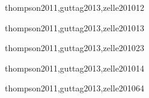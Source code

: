 \begin{syllabus}
\begin{unit}{\PLOverviewDef}{thompson2011,guttag2013,zelle2010}{1}{2}
   \begin{unitgoals}
      \item \PLOverviewObjONE
      \item \PLOverviewObjTWO
   \end{unitgoals}
\end{unit}

\begin{unit}{\PLDeclarationsAndTypesDef}{thompson2011,guttag2013,zelle2010}{1}{3}
    \begin{topics}%
	\item \PLDeclarationsAndTypesTopicThe%
	\item \PLDeclarationsAndTypesTopicOverview%
    \end{topics}%
    \PLDeclarationsAndTypesAllObjectives
\end{unit}

\begin{unit}{\PFFundamentalConstructsDef}{thompson2011,guttag2013,zelle2010}{2}{3}
  \PFFundamentalConstructsAllTopics
  \PFFundamentalConstructsAllObjectives
\end{unit}

\begin{unit}{\PLFunctionalProgrammingDef}{thompson2011,guttag2013,zelle2010}{1}{4}
    \begin{topics}%
	\item \PLFunctionalProgrammingTopicOverview%
	\item \PLFunctionalProgrammingTopicRecursion%
	\item \PLFunctionalProgrammingTopicPragmatics%
    \end{topics}%
   \PLFunctionalProgrammingAllObjectives
\end{unit}

\begin{unit}{\PFRecursionDef}{thompson2011,guttag2013,zelle2010}{6}{4}
    \begin{topics}%
	\item \PFRecursionTopicTheconcept%
	\item \PFRecursionTopicRecursive%
	\item \PFRecursionTopicSimple%
	\item \PFRecursionTopicDiveAndConquer%
    \end{topics}%

    \begin{unitgoals}%
	\item \PFRecursionObjONE%
	\item \PFRecursionObjTWO%
	\item \PFRecursionObjTHREE%
	\item \PFRecursionObjFOUR%
	\item \PFRecursionObjFIVE%
	\item \PFRecursionObjSIX%
	\item \PFRecursionObjEIGHT%
    \end{unitgoals}%
\end{unit}


\end{syllabus}
